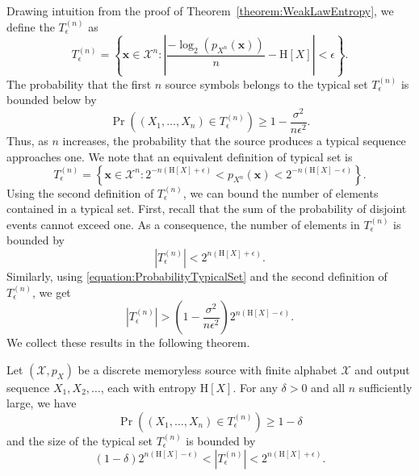 Drawing intuition from the proof of Theorem~\ref{theorem:WeakLawEntropy}, we define the  $T_{\epsilon}^{(n)}$ as
\begin{equation*}
T_{\epsilon}^{(n)}
= \left\{ \mathbf{x} \in \mathcal{X}^n :
\left| \frac{- \log_2 \left( p_{X^n} (\mathbf{x}) \right)}{n} - \mathrm{H}[X] \right|
< \epsilon \right\} .
\end{equation*}
The probability that the first $n$ source symbols belongs to the typical set $T_{\epsilon}^{(n)}$ is bounded below by
\begin{equation} \label{equation:ProbabilityTypicalSet}
\Pr \left( (X_1, \ldots, X_n) \in T_{\epsilon}^{(n)} \right) \geq 1 - \frac{\sigma^2}{n \epsilon^2} .
\end{equation}
Thus, as $n$ increases, the probability that the source produces a typical sequence approaches one.
We note that an equivalent definition of typical set is
\begin{equation*}
T_{\epsilon}^{(n)}
= \left\{ \mathbf{x} \in \mathcal{X}^n :
2^{- n (\mathrm{H}[X] + \epsilon)} < p_{X^n} (\mathbf{x})
< 2^{- n (\mathrm{H}[X] - \epsilon)} \right\} .
\end{equation*}
Using the second definition of $T_{\epsilon}^{(n)}$, we can bound the number of elements contained in a typical set.
First, recall that the sum of the probability of disjoint events cannot exceed one.
As a consequence, the number of elements in $T_{\epsilon}^{(n)}$ is bounded by
\begin{equation*}
\left| T_{\epsilon}^{(n)} \right| < 2^{n (\mathrm{H}[X] + \epsilon)} .
\end{equation*}
Similarly, using \eqref{equation:ProbabilityTypicalSet} and the second definition of $T_{\epsilon}^{(n)}$, we get
\begin{equation*}
\left| T_{\epsilon}^{(n)} \right| > \left( 1 - \frac{\sigma^2}{n \epsilon^2} \right)
2^{n (\mathrm{H}[X] - \epsilon)} .
\end{equation*}
We collect these results in the following theorem.

\begin{theorem} \label{theorem:AEP}
Let $(\mathcal{X}, p_X)$ be a discrete memoryless source with finite alphabet $\mathcal{X}$ and output sequence $X_1, X_2, \ldots$, each with entropy $\mathrm{H}[X]$.
For any $\delta > 0$ and all $n$ sufficiently large, we have
\begin{equation*}
\Pr \left( (X_1, \ldots, X_n) \in T_{\epsilon}^{(n)} \right) \geq 1 - \delta
\end{equation*}
and the size of the typical set $T_{\epsilon}^{(n)}$ is bounded by
\begin{equation*}
(1 - \delta) 2^{n (\mathrm{H}[X] - \epsilon)} <
\left| T_{\epsilon}^{(n)} \right| < 2^{n (\mathrm{H}[X] + \epsilon)} .
\end{equation*}
\end{theorem}

